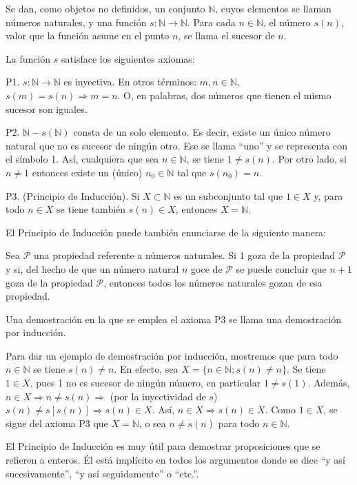 Se dan, como objetos no definidos, un conjunto \(\mathbb{N}\), cuyos elementos se llaman números naturales, y una función \(s: \mathbb{N} \to \mathbb{N}\). Para cada \(n \in \mathbb{N}\), el número \(s(n)\), valor que la función asume en el punto \(n\), se llama el sucesor de \(n\).

La función \(s\) satisface los siguientes axiomas:

P1. \(s: \mathbb{N} \to \mathbb{N}\) es inyectiva. En otros términos: \(m, n \in \mathbb{N}\), \(s(m) = s(n) \Rightarrow m = n\). O, en palabras, dos números que tienen el mismo sucesor son iguales.

P2. \(\mathbb{N} - s(\mathbb{N})\) consta de un solo elemento. Es decir, existe un único número natural que no es sucesor de ningún otro. Ese se llama “uno” y se representa con el símbolo 1. Así, cualquiera que sea \(n \in \mathbb{N}\), se tiene \(1 \neq s(n)\). Por otro lado, si \(n \neq 1\) entonces existe un (único) \(n_0 \in \mathbb{N}\) tal que \(s(n_0) = n\).

P3. (Principio de Inducción). Si \(X \subset \mathbb{N}\) es un subconjunto tal que \(1 \in X\) y, para todo \(n \in X\) se tiene también \(s(n) \in X\), entonces \(X = \mathbb{N}\).

El Principio de Inducción puede también enunciarse de la siguiente manera:

Sea \(\mathcal{P}\) una propiedad referente a números naturales. Si 1 goza de la propiedad \(\mathcal{P}\) y si, del hecho de que un número natural \(n\) goce de \(\mathcal{P}\) se puede concluir que \(n + 1\) goza de la propiedad \(\mathcal{P}\), entonces todos los números naturales gozan de esa propiedad.

Una demostración en la que se emplea el axioma P3 se llama una demostración por inducción.

Para dar un ejemplo de demostración por inducción, mostremos que para todo \(n \in \mathbb{N}\) se tiene \(s(n) \neq n\). En efecto, sea \(X = \{n \in \mathbb{N}; s(n) \neq n\}\). Se tiene \(1 \in X\), pues 1 no es sucesor de ningún número, en particular \(1 \neq s(1)\). Además, \(n \in X \Rightarrow n \neq s(n) \Rightarrow\) (por la inyectividad de \(s\)) \(s(n) \neq s[s(n)] \Rightarrow s(n) \in X\). Así, \(n \in X \Rightarrow s(n) \in X\). Como \(1 \in X\), se sigue del axioma P3 que \(X = \mathbb{N}\), o sea \(n \neq s(n)\) para todo \(n \in \mathbb{N}\).

El Principio de Inducción es muy útil para demostrar proposiciones que se refieren a enteros. Él está implícito en todos los argumentos donde se dice “y así sucesivamente”, “y así seguidamente” o “etc.”.


